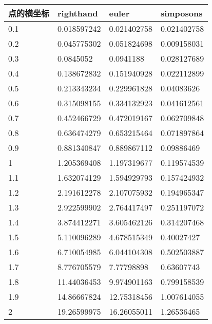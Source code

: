 \documentclass[a4paper,12pt]{article}
\begin{document}
\begin{center}
\begin{tabular}{|l|l|l|l|}
  \hline
点的横坐标&righthand&euler&simposons\\
  \hline
0.1&0.018597242&0.021402758&0.021402758\\
0.2&0.045775302&0.051824698&0.009158031\\
0.3&0.0845052&0.0941188&0.028127689\\
0.4&0.138672832&0.151940928&0.022112899\\
0.5&0.213343234&0.229961828&0.04083626\\
0.6&0.315098155&0.334132923&0.041612561\\
0.7&0.452466729&0.472019167&0.062709848\\
0.8&0.636474279&0.653215464&0.071897864\\
0.9&0.881340847&0.889867112&0.09886469\\
1&1.205369408&1.197319677&0.119574539\\
1.1&1.632074129&1.594929793&0.157424932\\
1.2&2.191612278&2.107075932&0.194965347\\
1.3&2.922599902&2.764417497&0.251197072\\
1.4&3.874412271&3.605462126&0.314207468\\
1.5&5.110096289&4.678515349&0.40027427\\
1.6&6.710054985&6.044104308&0.502503887\\
1.7&8.776705579&7.77798898&0.63607743\\
1.8&11.44036453&9.974901163&0.799158539\\
1.9&14.86667824&12.75318456&1.007614055\\
2&19.26599975&16.26055011&1.26536465\\
  \hline
\end{tabular}
\end{center}
\end{document}
